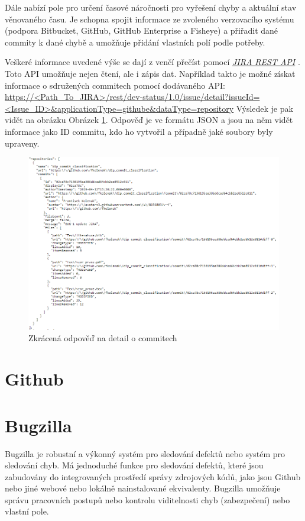 \documentclass[czech,DP]{thesiskiv}
\begin{document}
Dále nabízí pole pro určení časové náročnosti pro vyřešení chyby a aktuální stav věnovaného času. Je schopna spojit informace ze zvoleného verzovacího systému (podpora Bitbucket, GitHub, GitHub Enterprise a Fisheye) a přiřadit dané commity k dané chybě a umožňuje přidání vlastních polí podle potřeby.

Veškeré informace uvedené výše se dají z venčí přečíst pomocí \textit{\href{https://docs.atlassian.com/software/jira/docs/api/REST/5.0-m5/}{JIRA REST API} }. Toto API umožňuje nejen čtení, ale i zápis dat. Například takto je možné získat informace o sdružených commitech pomocí dodávaného API:
\url{https://<Path_To_JIRA>/rest/dev-status/1.0/issue/detail?issueId=<Issue_ID>&applicationType=githube&dataType=repository}
Výsledek je pak vidět na obrázku Obrázek \ref{pic:JIRAresponse}. Odpověď je ve formátu JSON a jsou na něm vidět informace jako ID commitu, kdo ho vytvořil a případně jaké soubory byly upraveny.

\begin{figure}[!ht]
\begin{center}
	\includegraphics[width=1.0\textwidth]{Pic/JIRAresponse.png}
\end{center}
\label{pic:JIRAresponse}
\caption{Zkrácená odpověď na detail o commitech}
\end{figure}

\section{Github}




\section{Bugzilla}
Bugzilla\citep{bugzillabugtracking} je robustní a výkonný systém pro sledování defektů nebo systém pro sledování chyb. Má jednoduché funkce pro sledování defektů, které jsou zabudovány do integrovaných prostředí správy zdrojových kódů, jako jsou Github nebo jiné webové nebo lokálně nainstalované ekvivalenty. Bugzilla umožňuje správu pracovních postupů nebo kontrolu viditelnosti chyb (zabezpečení) nebo vlastní pole.
\end{document}
